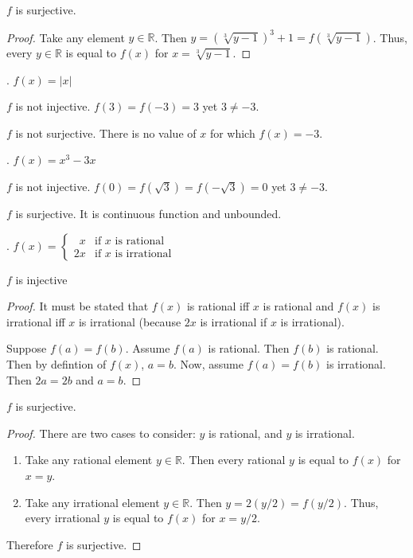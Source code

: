 \documentclass[twoside]{amsart}
\begin{document}
\begin{enumerate}[A.]
   \noindent $f$ is surjective.
   \begin{proof}
   Take any element $y\in\mathbb{R}$. Then $y=(\sqrt[3]{y-1})^3 + 1 =
   f(\sqrt[3]{y-1})$.
   Thus, every $y\in\mathbb{R}$ is equal to $f(x)$ for $x=\sqrt[3]{y-1}$.
   \end{proof}

   . $f(x)=|x|$
   
   \noindent $f$ is not injective. $f(3)=f(-3)=3$ yet $3\ne -3$.

   \noindent $f$ is not surjective. There is no value of $x$
   for which $f(x)=-3$.

   . $f(x)=x^3-3x$

   \noindent $f$ is not injective. $f(0)=f(\sqrt{3})=f(-\sqrt{3})=0$ yet
   $3\ne-3$.

   \noindent $f$ is surjective. It is continuous function and unbounded.

   . $f(x) = \displaystyle 
      \begin{cases}
         \phantom{2}x &\text{if $x$ is rational}\\
	           2x &\text{if $x$ is irrational}
      \end{cases}$


   \noindent $f$ is injective
   \begin{proof}
      It must be stated that $f(x)$ is rational iff $x$ is rational
      and $f(x)$ is irrational iff $x$ is irrational (because $2x$
      is irrational if $x$ is irrational).

      Suppose $f(a)=f(b)$. Assume $f(a)$ is rational. Then $f(b)$
      is rational. Then by defintion of $f(x)$, $a=b$. Now, assume
      $f(a)=f(b)$ is irrational. Then $2a=2b$ and $a=b$.
   \end{proof}

   \noindent $f$ is surjective.
   \begin{proof}
   There are two cases to consider: $y$ is rational, and $y$ is irrational.
   \begin{enumerate}[(1)]
      \item Take any rational element $y \in \mathbb{R}$. Then every
      rational $y$ is
      equal to $f(x)$ for $x=y$.

      \item Take any irrational element $y \in \mathbb{R}$. Then $y=2(y/2)=
      f(y/2)$. Thus, every irrational $y$ is equal to $f(x)$ for 
      $x=y/2$.
   \end{enumerate}
   Therefore $f$ is surjective.
   \end{proof}


\end{enumerate}
\end{document}
